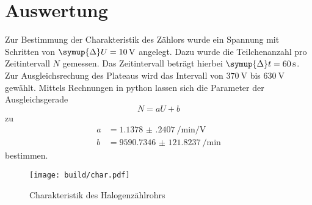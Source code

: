 \section{Auswertung}
\label{sec:Auswertung}
Zur Bestimmung der Charakteristik des Zählors wurde ein Spannung mit Schritten von $\symup{\Delta} U = \SI{10}{\volt}$ angelegt.
Dazu wurde die Teilchenanzahl pro Zeitintervall $N$ gemessen. 
Das Zeitintervall beträgt hierbei $\symup{\Delta} t = \SI{60}{\second}$.
Zur Ausgleichsrechung des Plateaus wird das Intervall von $\SI{370}{\volt}$ bis $\SI{630}{\volt}$ gewählt.
Mittels Rechnungen in python lassen sich die Parameter der Ausgleichsgerade 
\begin{equation}
  N = aU + b
\end{equation}
zu 
\begin{align}
  a &= \SI{1.1378(2407)}{\per\minute\per\volt} \\
  b &= \SI{9590.7346(1218237)}{\per\minute}
\end{align}
bestimmen.
\begin{figure}
  \centering
  \caption{Charakteristik des Halogenzählrohrs}
  \texttt{[image: build/char.pdf]}
\end{figure}